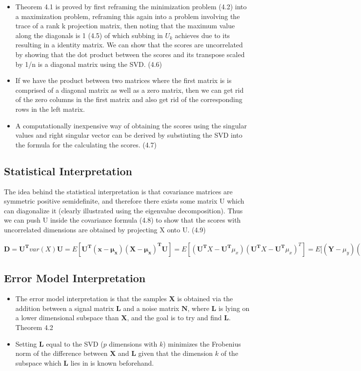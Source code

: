 \documentclass[english]{latex4ei/latex4ei_sheet}
\begin{document}
\begin{sectionbox}
\begin{itemize}
\item Theorem 4.1 is proved by first reframing the minimization problem (4.2) into a maximization problem, reframing this again into a problem involving the trace of a rank k projection matrix, then noting that the maximum value along the diagonals is 1 (4.5) of which subbing in $U_k$ achieves due to its resulting in a identity matrix.
We can show that the scores are uncorrelated by showing that the dot product between the scores and its transpose scaled by 1/n is a diagonal matrix using the SVD. (4.6)
\item If we have the product between two matrices where the first matrix is is comprised of a diagonal matrix as well as a zero matrix, then we can get rid of the zero columns in the first matrix and also get rid of the corresponding rows in the left matrix.
\item A computationally inexpensive way of obtaining the scores using the singular values and right singular vector can be derived by substiuting the SVD into the formula for the calculating the scores. (4.7)
\end{itemize}

\subsection{Statistical Interpretation}
The idea behind the statistical interpretation is that covariance matrices are symmetric positive semidefinite, and therefore there exists some matrix U which can diagonalize it (clearly illustrated using the eigenvalue decomposition). Thus we can push U inside the covariance formula (4.8) to show that the scores with uncorrelated dimensions are obtained by projecting X onto U. (4.9)
\begin{emphbox}
        $\boldsymbol{D}=\boldsymbol{U^T}var(X)\boldsymbol{U} = E[\boldsymbol{U^T(x-\mu_x)(X-\mu_x)^T\boldsymbol{U}}]=E[(\boldsymbol{U^T}X-\boldsymbol{U^T}\mu_x)(\boldsymbol{U^T}X-\boldsymbol{U^T}\mu_x)^T]=E[(\boldsymbol{Y}-\mu_y)(\boldsymbol{Y}-\mu_y)^T=var(\boldsymbol{Y})$
\end{emphbox}
\subsection{Error Model Interpretation}
\begin{itemize}
\item The error model interpretation is that the samples $\boldsymbol{X}$ is obtained via the addition between a signal matrix $\boldsymbol{L}$ and a noise matrix $\boldsymbol{N}$, where $\boldsymbol{L}$ is lying on a lower dimensional subspace than $\boldsymbol{X}$, and the goal is to try and find $\boldsymbol{L}$.
Theorem 4.2
\item Setting $\boldsymbol{L}$ equal to the SVD ($p$ dimensions with $k$) minimizes the Frobenius norm of the difference between $\boldsymbol{X}$ and $\boldsymbol{L}$ given that the dimension $k$ of the subspace which $\boldsymbol{L}$ lies in is known beforehand.
\end{itemize}
\end{sectionbox}
\end{document}
